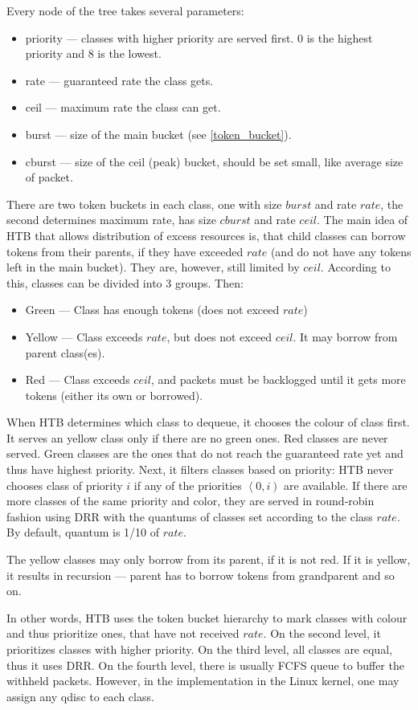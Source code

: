 Every node of the tree takes several parameters:
\begin{itemize}
	\item priority --- classes with higher priority are served first. 0 is the highest priority and 8 is the lowest.
	\item rate --- guaranteed rate the class gets.
	\item ceil --- maximum rate the class can get.
	\item burst --- size of the main bucket (see \ref{token_bucket}).
	\item cburst --- size of the ceil (peak) bucket, should be set small, like average size of packet.
\end{itemize}

There are two token buckets in each class, one with size $burst$ and rate $rate$, the second determines maximum rate, has size $cburst$ and rate $ceil$. The main idea of HTB that allows distribution of excess resources is, that child classes can borrow tokens from their parents, if they have exceeded $rate$ (and do not have any tokens left in the main bucket). They are, however, still limited by $ceil$. According to this, classes can be divided into 3 groups. Then:
\begin{itemize}
	\item Green --- Class has enough tokens (does not exceed $rate$)
	\item Yellow --- Class exceeds $rate$, but does not exceed $ceil$. It may borrow from parent class(es).
	\item Red --- Class exceeds $ceil$, and packets must be backlogged until it gets more tokens (either its own or borrowed).
\end{itemize}


When HTB determines which class to dequeue, it chooses the colour of class first. It serves an yellow class only if there are no green ones. Red classes are never served. Green classes are the ones that do not reach the guaranteed rate yet and thus have highest priority. Next, it filters classes based on priority: HTB never chooses class of priority $i$ if any of the priorities $\left\langle0,i\right)$ are available. If there are more classes of the same priority and color, they are served in round-robin fashion using DRR with the quantums of classes set according to the class $rate$. By default, quantum is 1/10 of $rate$. 

The yellow classes may only borrow from its parent, if it is not red. If it is yellow, it results in recursion --- parent has to borrow tokens from grandparent and so on.

In other words, HTB uses the token bucket hierarchy to mark classes with colour and thus prioritize ones, that have not received $rate$. On the second level, it prioritizes classes with higher priority. On the third level, all classes are equal, thus it uses DRR. On the fourth level, there is usually FCFS queue to buffer the withheld packets. However, in the implementation in the Linux kernel, one may assign any qdisc to each class.

